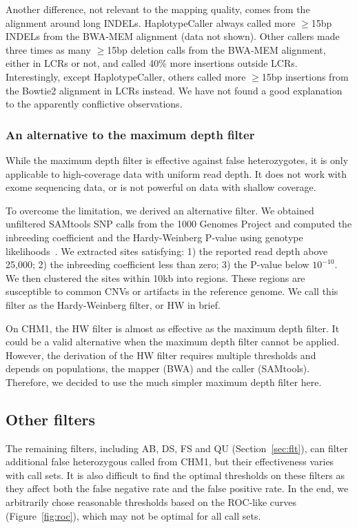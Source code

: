 \documentclass{bioinfo-ori}
\begin{document}
Another difference, not relevant to the mapping quality, comes from the alignment
around long INDELs. HaplotypeCaller always called more $\ge$15bp INDELs from
the BWA-MEM alignment (data not shown). Other callers made three times as many $\ge$15bp
deletion calls from the BWA-MEM alignment, either in LCRs or not, and called
40\% more insertions outside LCRs. Interestingly, except HaplotypeCaller,
others called more $\ge$15bp insertions from the Bowtie2 alignment in LCRs
instead. We have not found a good explanation to the apparently conflictive
observations.

\subsubsection{An alternative to the maximum depth filter}
While the maximum depth filter is effective against false heterozygotes, it is
only applicable to high-coverage data with uniform read depth. It
does not work with exome sequencing data, or is not powerful on data with
shallow coverage.

To overcome the limitation, we derived an alternative filter. We obtained
unfiltered SAMtools SNP calls from the 1000 Genomes Project and computed the
inbreeding coefficient and the Hardy-Weinberg P-value using genotype
likelihoods~\citep{Li:2011ab}. We extracted sites satisfying: 1) the reported
read depth above 25,000; 2) the inbreeding coefficient less than zero; 3) the
P-value below $10^{-10}$. We then clustered the sites within 10kb into regions.
These regions are susceptible to common CNVs or artifacts in the reference
genome. We call this filter as the Hardy-Weinberg filter, or HW in brief.

On CHM1, the HW filter is almost as effective as the maximum depth filter.
It could be a valid alternative when the maximum depth filter cannot be
applied.  However, the derivation of the HW filter requires multiple
thresholds and depends on populations, the mapper (BWA) and the caller
(SAMtools). Therefore, we decided to use the much simpler maximum depth filter
here.

\subsection{Other filters}
The remaining filters, including AB, DS, FS and QU (Section~\ref{sec:flt}), can
filter additional false heterozygous called from CHM1, but their effectiveness
varies with call sets. It is also difficult to find the optimal thresholds on
these filters as they affect both the false negative rate and the false
positive rate. In the end, we arbitrarily chose reasonable thresholds based on
the ROC-like curves (Figure~\ref{fig:roc}), which may not be optimal for all
call sets.
\end{document}
